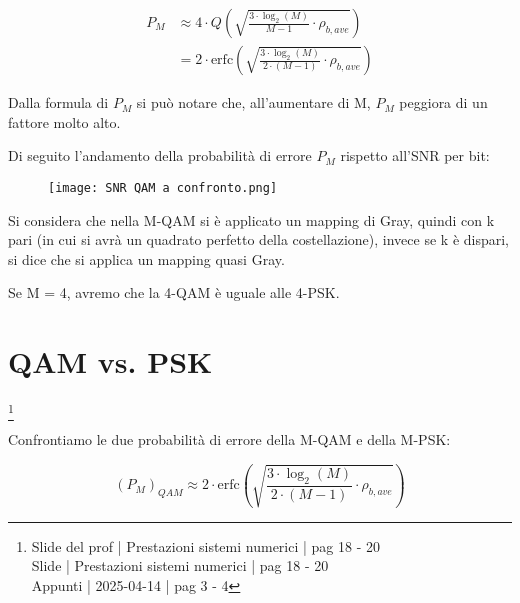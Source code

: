 {
    \Large 
    \begin{equation}
        \begin{split}
            P_M 
            &\approx
            4 \cdot Q
            \left(
                \sqrt{
                    \frac{
                        3 \cdot \log_{2} (M)
                    }{M-1}
                    \cdot 
                    \rho_{b, ave}
                }
            \right)
            \\
            &= 
            2 \cdot 
            \text{erfc}
            \left(
                \sqrt{
                    \frac{
                        3 \cdot \log_{2} (M)
                    }{2 \cdot (M-1)}
                    \cdot 
                    \rho_{b, ave}
                }
            \right)
        \end{split}
    \end{equation}
}

Dalla formula di $P_M$ si può notare che, all'aumentare di M, 
$P_M$ peggiora di un fattore molto alto. \newline 

Di seguito l'andamento della probabilità di errore $P_M$ rispetto all'SNR per bit: 

\begin{figure}[h]
    \centering
    \texttt{[image: SNR QAM a confronto.png]}
\end{figure}

Si considera che nella M-QAM si è applicato un mapping di Gray, quindi con k pari (in cui si avrà un quadrato perfetto della costellazione), 
invece se k è dispari, si dice che si applica un mapping quasi Gray. \newline 

Se M = 4, avremo che la 4-QAM è uguale alle 4-PSK. \newline 

\newpage 

\section{QAM vs. PSK}
\footnote{Slide del prof | Prestazioni sistemi numerici | pag 18 - 20 \\
Slide | Prestazioni sistemi numerici | pag 18 - 20 \\
Appunti | 2025-04-14 | pag 3 - 4
}

Confrontiamo le due probabilità di errore della M-QAM e della M-PSK: 

{
    \Large 
    \begin{equation}
        \left(
            P_M
        \right)_{QAM}
         \approx 
            2 \cdot 
            \text{erfc}
            \left(
                \sqrt{
                    \frac{
                        3 \cdot \log_{2} (M)
                    }{2 \cdot (M-1)}
                    \cdot 
                    \rho_{b, ave}
                }
            \right)
    \end{equation}
}


